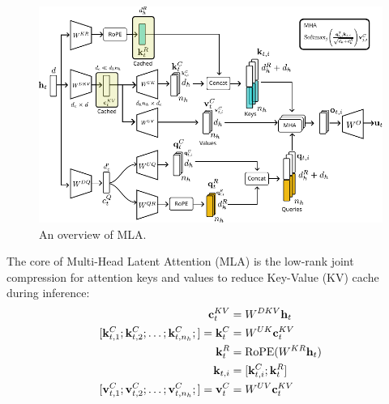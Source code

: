\begin{figure}[h]
	\centering
	\includegraphics[scale=1.1]{./images/transformer/mla.pdf}
	\caption{An overview of MLA.}
\end{figure}
The core of Multi-Head Latent Attention (MLA) is the low-rank joint compression for attention keys and values to reduce Key-Value (KV) cache during inference:
\begin{align*}
	\rvc_t^{KV} &= W^{DKV}\rvh_t\\
	[\rvk_{t,1}^C; \rvk_{t,2}^C; \dots ;\rvk_{t,n_h}^C;] = \rvk_t^{C} &= W^{UK}\rvc_t^{KV}\\
	\rvk_t^{R} &= \text{RoPE}(W^{KR}\rvh_t)\\
	\rvk_{t,i} &= [\rvk_{t,i}^C;\rvk_t^{R}]\\
	[\rvv_{t,1}^C; \rvv_{t,2}^C; \dots ;\rvv_{t,n_h}^C;] = \rvv_t^{C} &= W^{UV}\rvc_t^{KV}
\end{align*}
